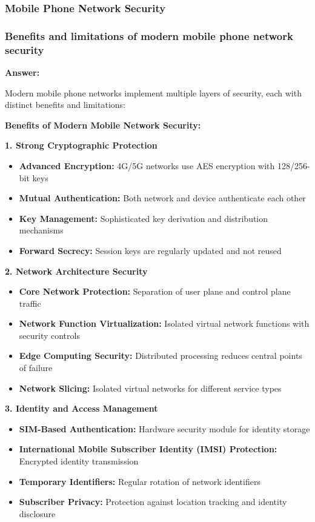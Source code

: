 \documentclass[12pt,a4paper]{article}
\begin{document}
\subsubsection{Mobile Phone Network Security}

\subsubsection{Benefits and limitations of modern mobile phone network security}

\textbf{Answer:}

Modern mobile phone networks implement multiple layers of security, each with distinct benefits and limitations:

\textbf{Benefits of Modern Mobile Network Security:}

\textbf{1. Strong Cryptographic Protection}
\begin{itemize}
    \item \textbf{Advanced Encryption:} 4G/5G networks use AES encryption with 128/256-bit keys
    \item \textbf{Mutual Authentication:} Both network and device authenticate each other
    \item \textbf{Key Management:} Sophisticated key derivation and distribution mechanisms
    \item \textbf{Forward Secrecy:} Session keys are regularly updated and not reused
\end{itemize}

\textbf{2. Network Architecture Security}
\begin{itemize}
    \item \textbf{Core Network Protection:} Separation of user plane and control plane traffic
    \item \textbf{Network Function Virtualization:} Isolated virtual network functions with security controls
    \item \textbf{Edge Computing Security:} Distributed processing reduces central points of failure
    \item \textbf{Network Slicing:} Isolated virtual networks for different service types
\end{itemize}

\textbf{3. Identity and Access Management}
\begin{itemize}
    \item \textbf{SIM-Based Authentication:} Hardware security module for identity storage
    \item \textbf{International Mobile Subscriber Identity (IMSI) Protection:} Encrypted identity transmission
    \item \textbf{Temporary Identifiers:} Regular rotation of network identifiers
    \item \textbf{Subscriber Privacy:} Protection against location tracking and identity disclosure
\end{itemize}
\end{document}
